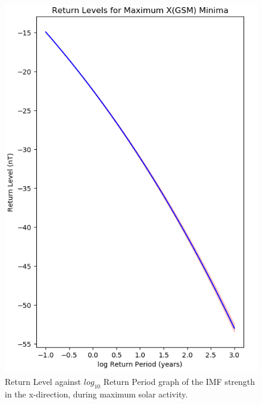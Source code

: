\documentclass[12pt]{article}
\begin{document}
\begin{figure}[t!]
\begin{minipage}{0.48\textwidth}
                \centering
                \includegraphics[width=\textwidth]{fig_method/MFImaxXminReturn.png}
                \caption{Return Level against $log_{10}$ Return Period graph of the IMF strength in the x-direction, during maximum solar activity.}
                \label{fig:MFImaxXminReturn}
            \end{minipage}
        \end{figure}
\end{document}
